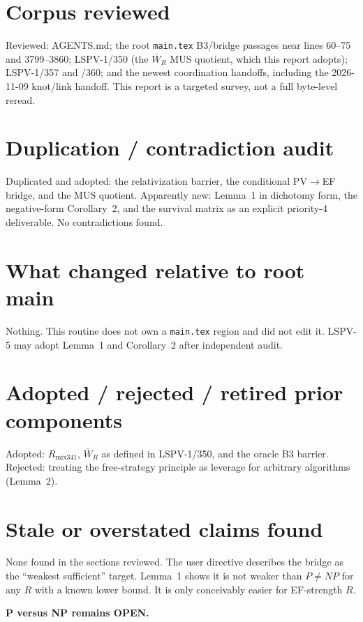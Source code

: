 \documentclass[11pt]{article}
\begin{document}
\section*{Corpus reviewed}
Reviewed: AGENTS.md; the root \texttt{main.tex} B3/bridge passages near lines 60--75 and 3799--3860; LSPV-1/350 (the $\overline W_R$ MUS quotient, which this report adopts); LSPV-1/357 and /360; and the newest coordination handoffs, including the 2026-11-09 knot/link handoff.
This report is a targeted survey, not a full byte-level reread.

\section*{Duplication / contradiction audit}
Duplicated and adopted: the relativization barrier, the conditional PV$\to$EF bridge, and the MUS quotient.
Apparently new: Lemma~1 in dichotomy form, the negative-form Corollary~2, and the survival matrix as an explicit priority-4 deliverable.
No contradictions found.

\section*{What changed relative to root main}
Nothing.
This routine does not own a \texttt{main.tex} region and did not edit it.
LSPV-5 may adopt Lemma~1 and Corollary~2 after independent audit.

\section*{Adopted / rejected / retired prior components}
Adopted: $R_{\mathrm{mix341}}$, $\overline W_R$ as defined in LSPV-1/350, and the oracle B3 barrier.
Rejected: treating the free-strategy principle as leverage for arbitrary algorithms (Lemma~2).

\section*{Stale or overstated claims found}
None found in the sections reviewed.
The user directive describes the bridge as the ``weakest sufficient'' target.
Lemma~1 shows it is not weaker than $P\ne NP$ for any $R$ with a known lower bound.
It is only conceivably easier for EF-strength $R$.

\bigskip\noindent\textbf{P versus NP remains OPEN.}
\end{document}
